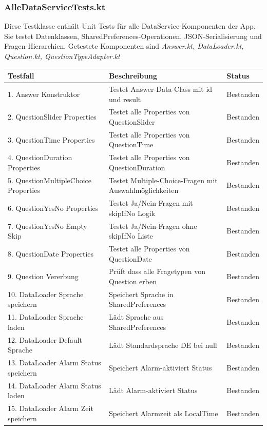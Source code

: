 \subsubsection{AlleDataServiceTests.kt}
Diese Testklasse enthält Unit Tests für alle DataService-Komponenten der App. Sie testet Datenklassen, SharedPreferences-Operationen, JSON-Serialisierung und Fragen-Hierarchien.
Getestete Komponenten sind \textit{Answer.kt, DataLoader.kt, Question.kt, QuestionTypeAdapter.kt}\\
\begin{tabularx}{\textwidth}{|l|X|l|}
\hline
\textbf{Testfall} & \textbf{Beschreibung} & \textbf{Status} \\
\hline
1. Answer Konstruktor & Testet Answer-Data-Class mit id und result & Bestanden\\
\hline
2. QuestionSlider Properties & Testet alle Properties von QuestionSlider & Bestanden\\
\hline
3. QuestionTime Properties & Testet alle Properties von QuestionTime & Bestanden\\
\hline
4. QuestionDuration Properties & Testet alle Properties von QuestionDuration & Bestanden\\
\hline
5. QuestionMultipleChoice Properties & Testet Multiple-Choice-Fragen mit Auswahlmöglichkeiten & Bestanden\\
\hline
6. QuestionYesNo Properties & Testet Ja/Nein-Fragen mit skipIfNo Logik & Bestanden\\
\hline
7. QuestionYesNo Empty Skip & Testet Ja/Nein-Fragen ohne skipIfNo Liste & Bestanden\\
\hline
8. QuestionDate Properties & Testet alle Properties von QuestionDate & Bestanden\\
\hline
9. Question Vererbung & Prüft dass alle Fragetypen von Question erben & Bestanden\\
\hline
10. DataLoader Sprache speichern & Speichert Sprache in SharedPreferences & Bestanden\\
\hline
11. DataLoader Sprache laden & Lädt Sprache aus SharedPreferences & Bestanden\\
\hline
12. DataLoader Default Sprache & Lädt Standardsprache DE bei null & Bestanden\\
\hline
13. DataLoader Alarm Status speichern & Speichert Alarm-aktiviert Status & Bestanden\\
\hline
14. DataLoader Alarm Status laden & Lädt Alarm-aktiviert Status & Bestanden\\
\hline
15. DataLoader Alarm Zeit speichern & Speichert Alarmzeit als LocalTime & Bestanden\\

\end{tabularx}
